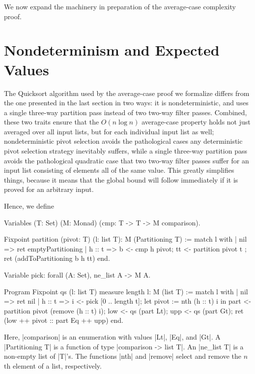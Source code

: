 \documentclass[runningheads]{llncs}
\begin{document}
We now expand the machinery in preparation of the average-case complexity proof.

\section{Nondeterminism and Expected Values}
\label{nondetexpec}

The Quicksort algorithm used by the average-case proof we formalize differs from the one presented in the last section in two ways: it is nondeterministic, and uses a single three-way partition pass instead of two two-way filter passes. Combined, these two traits ensure that the $O(n \log n)$ average-case property holds not just averaged over all input lists, but for each individual input list as well; nondeterministic pivot selection avoids the pathological cases any deterministic pivot selection strategy inevitably suffers, while a single three-way partition pass avoids the pathological quadratic case that two two-way filter passes suffer for an input list consisting of elements all of the same value. This greatly simplifies things, because it means that the global bound will follow immediately if it is proved for an arbitrary input.

Hence, we define

\parbox{\textwidth}{\begin{code}
  Variables (T: Set) (M: Monad) (cmp: T -> T -> M comparison).

  Fixpoint partition (pivot: T) (l: list T): M (Partitioning T) :=
    match l with
    | nil => ret emptyPartitioning
    | h :: t =>
        b <- cmp h pivot;
        tt <- partition pivot t ;
        ret (addToPartitioning b h tt)
    end.

  Variable pick: forall (A: Set), ne_list A -> M A.

  Program Fixpoint qs (l: list T) {measure length l}: M (list T) :=
    match l with
    | nil => ret nil
    | h :: t =>
        i <- pick [0 .. length t];
        let pivot := nth (h :: t) i in
        part <- partition pivot (remove (h :: t) i);
        low <- qs (part Lt);
        upp <- qs (part Gt);
        ret (low ++ pivot :: part Eq ++ upp)
    end.
\end{code}}
Here, |comparison| is an enumeration with values |Lt|, |Eq|, and |Gt|. A |Partitioning T| is a function of type |comparison -> list T|. An |ne_list T| is a non-empty list of |T|'s. The functions |nth| and |remove| select and remove the $n$th element of a list, respectively.
\end{document}
